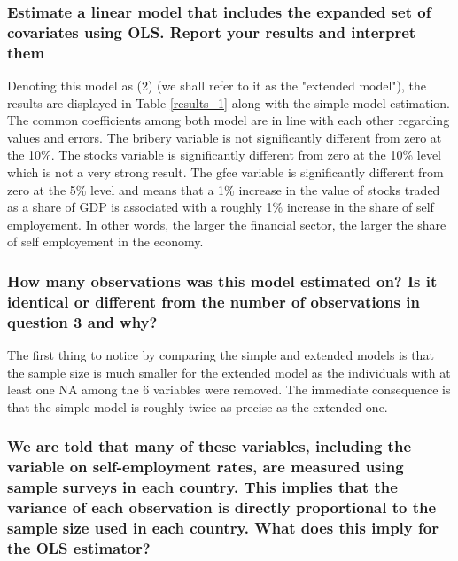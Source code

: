 \subsubsection{Estimate a linear model that includes the expanded set of covariates using OLS. Report
your results and interpret them}
Denoting this model as (2) (we shall refer to it as the "extended model"), the results are displayed in Table \ref{results_1} along with the simple model estimation.
The common coefficients among both model are in line with each other regarding values and errors.
The bribery variable is not significantly different from zero at the 10\%.
The stocks variable is significantly different from zero at the 10\% level which is not a very strong result.
The gfce variable is significantly different from zero at the 5\% level and means that a 1\% increase in the value of stocks traded as a share of GDP is associated with a roughly 1\% increase in the share of self employement.
In other words, the larger the financial sector, the larger the share of self employement in the economy. 
\subsubsection{How many observations was this model estimated on? Is it identical or different from the number of observations in question 3 and why?}
The first thing to notice by comparing the simple and extended models is that the sample size is much smaller for the extended
model as the individuals with at least one NA among the 6 variables were removed.
The immediate consequence is that the simple model is roughly twice as precise as the extended one.
\subsubsection{We are told that many of these variables, including the variable on self-employment rates, are measured using sample surveys in each country. This implies that the variance of each observation is directly proportional to the sample size used in each country. What does this imply for the OLS estimator?}
